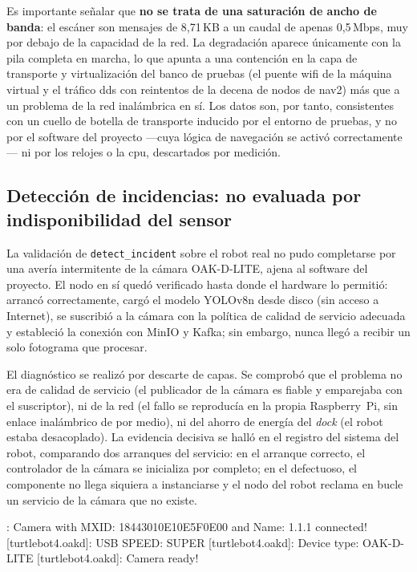 Es importante señalar que \textbf{no se trata de una saturación de ancho de banda}: el escáner
son mensajes de 8,71\,KB a un caudal de apenas 0,5\,Mbps, muy por debajo de la capacidad de la
red. La degradación aparece únicamente con la pila completa en marcha, lo que apunta a una
contención en la capa de transporte y virtualización del banco de pruebas (el puente wifi de
la máquina virtual y el tráfico \gls{dds} con reintentos de la decena de nodos de \gls{nav2})
más que a un problema de la red inalámbrica en sí. Los datos son, por tanto, consistentes con
un cuello de botella de transporte inducido por el entorno de pruebas, y no por el software del
proyecto —cuya lógica de navegación se activó correctamente— ni por los relojes o la \gls{cpu},
descartados por medición.

\subsection{Detección de incidencias: no evaluada por indisponibilidad del sensor}
\label{sec:real-deteccion}

La validación de \texttt{detect\_incident} sobre el robot real no pudo completarse por una
avería intermitente de la cámara OAK-D-LITE, ajena al software del proyecto. El nodo en sí
quedó verificado hasta donde el hardware lo permitió: arrancó correctamente, cargó el modelo
YOLOv8n desde disco (sin acceso a Internet), se suscribió a la cámara con la política de
calidad de servicio adecuada y estableció la conexión con MinIO y Kafka; sin embargo, nunca
llegó a recibir un solo fotograma que procesar.

El diagnóstico se realizó por descarte de capas. Se comprobó que el problema no era de calidad
de servicio (el publicador de la cámara es fiable y emparejaba con el suscriptor), ni de la red
(el fallo se reproducía en la propia Raspberry~Pi, sin enlace inalámbrico de por medio), ni del
ahorro de energía del \emph{dock} (el robot estaba desacoplado). La evidencia decisiva se halló
en el registro del sistema del robot, comparando dos arranques del servicio: en el arranque
correcto, el controlador de la cámara se inicializa por completo; en el defectuoso, el
componente no llega siquiera a instanciarse y el nodo del robot reclama en bucle un servicio de
la cámara que no existe.

\begin{terminal}: Camera with MXID: 18443010E10E5F0E00 and Name: 1.1.1 connected!
[turtlebot4.oakd]: USB SPEED: SUPER
[turtlebot4.oakd]: Device type: OAK-D-LITE
[turtlebot4.oakd]: Camera ready!
\end{terminal}


